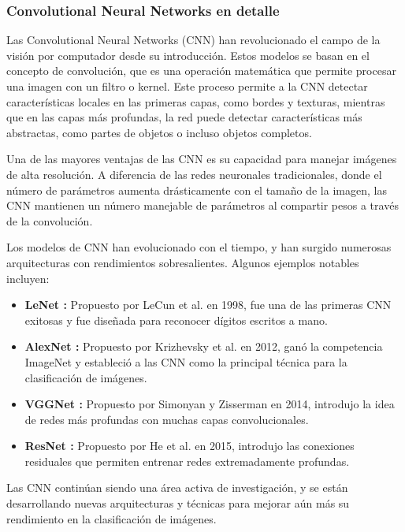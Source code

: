 \documentclass[10pt,a4paper,twocolumn,twoside]{article}
\begin{document}
\subsubsection{Convolutional Neural Networks en detalle}

Las Convolutional Neural Networks (CNN) han revolucionado el campo de la visión por computador desde su introducción. Estos modelos se basan en el concepto de convolución, que es una operación matemática que permite procesar una imagen con un filtro o kernel. Este proceso permite a la CNN detectar características locales en las primeras capas, como bordes y texturas, mientras que en las capas más profundas, la red puede detectar características más abstractas, como partes de objetos o incluso objetos completos.

Una de las mayores ventajas de las CNN es su capacidad para manejar imágenes de alta resolución. A diferencia de las redes neuronales tradicionales, donde el número de parámetros aumenta drásticamente con el tamaño de la imagen, las CNN mantienen un número manejable de parámetros al compartir pesos a través de la convolución.

Los modelos de CNN han evolucionado con el tiempo, y han surgido numerosas arquitecturas con rendimientos sobresalientes. Algunos ejemplos notables incluyen:

\begin{itemize}
    \item \textbf{LeNet \cite{lenet}:} Propuesto por LeCun et al. en 1998, fue una de las primeras CNN exitosas y fue diseñada para reconocer dígitos escritos a mano.
    \item \textbf{AlexNet \cite{alexnet}:} Propuesto por Krizhevsky et al. en 2012, ganó la competencia ImageNet y estableció a las CNN como la principal técnica para la clasificación de imágenes.
    \item \textbf{VGGNet \cite{vgg}:} Propuesto por Simonyan y Zisserman en 2014, introdujo la idea de redes más profundas con muchas capas convolucionales. 
    \item \textbf{ResNet \cite{resnet}:} Propuesto por He et al. en 2015, introdujo las conexiones residuales que permiten entrenar redes extremadamente profundas.
\end{itemize}

Las CNN continúan siendo una área activa de investigación, y se están desarrollando nuevas arquitecturas y técnicas para mejorar aún más su rendimiento en la clasificación de imágenes.
\end{document}
